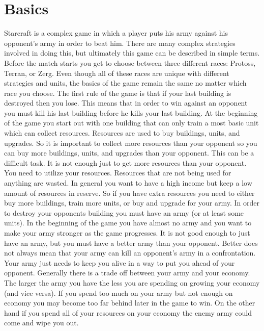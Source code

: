 \section{Basics}
	Starcraft is a complex game in which a player puts his army against his opponent's army in order to beat him. 
	There are many complex strategies involved in doing this, but ultimately this game can be described in simple terms.
	Before the match starts you get to choose between three different races: Protoss, Terran, or Zerg. 
	Even though all of these races are unique with different strategies and units, the basics of the game remain the same no matter which race you choose.
	The first rule of the game is that if your last building is destroyed then you lose. 
	This means that in order to win against an opponent you must kill his last building before he kills your last building. 
	At the beginning of the game you start out with one building that can only train a most basic unit which can collect resources. 
	Resources are used to buy buildings, units, and upgrades. 
	So it is important to collect more resources than your opponent so you can buy more buildings, units, and upgrades than your opponent.
	This can be a difficult task. It is not enough just to get more resources than your opponent. 
	You need to utilize your resources. Resources that are not being used for anything are wasted. 
	In general you want to have a high income but keep a low amount of resources in reserve. 
	So if you have extra resources you need to either buy more buildings, train more units, or buy and upgrade for your army.
	In order to destroy your opponents building you must have an army (or at least some units). 
	In the beginning of the game you have almost no army and you want to make your army stronger as the game progresses. 
	It is not good enough to just have an army, but you must have a better army than your opponent. 
	Better does not always mean that your army can kill an opponent's army in a confrontation. 
	Your army just needs to keep you alive in a way to put you ahead of your opponent.
	Generally there is a trade off between your army and your economy. 
	The larger the army you have the less you are spending on growing your economy (and vice versa). 
	If you spend too much on your army but not enough on economy you may become too far behind later in the game to win. 
	On the other hand if you spend all of your resources on your economy the enemy army could come and wipe you out.

 